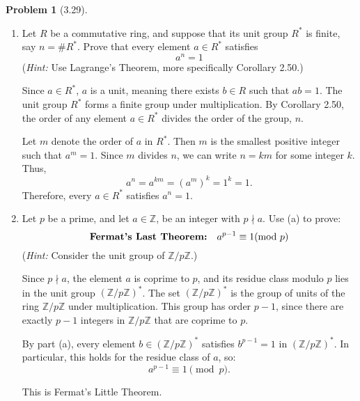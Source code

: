 \documentclass[12pt]{article}
\theoremstyle{definition}
\newtheorem{problem}{Problem}
\begin{document}
\begin{problem}[3.29]
    \begin{enumerate}[label=(\alph*)]
        \item Let $R$ be a commutative ring, and suppose that its unit group $R^*$ is finite, say $n = \#R^*$.
                Prove that every element $a \in R^*$ satisfies
                \[  
                    a^n = 1
                \]
        (\textit{Hint:} Use Lagrange's Theorem, more specifically Corollary 2.50.)

        \begin{solution}
            Since $a \in R^*$, $a$ is a unit, meaning there exists $b \in R$ such that $ab = 1$. The unit group $R^*$ forms a finite group under multiplication. By Corollary 2.50, the order of any element $a \in R^*$ divides the order of the group, $n$.
            
            Let $m$ denote the order of $a$ in $R^*$. Then $m$ is the smallest positive integer such that $a^m = 1$. Since $m$ divides $n$, we can write $n = km$ for some integer $k$. Thus,
            \[
            a^n = a^{km} = (a^m)^k = 1^k = 1.
            \]
            Therefore, every $a \in R^*$ satisfies $a^n = 1$.
        \end{solution}
        \item Let $p$ be a prime, and let $a \in \mathbb{Z}$, be an integer with $p \nmid a$. Use (a) to prove:
        \[ 
            \text{\textbf{Fermat's Last Theorem:}} \hspace{10px} a^{p - 1} \equiv 1 (\text{mod } p)
        \]
        (\textit{Hint:} Consider the unit group of $\mathbb{Z}/p\mathbb{Z}$.)

        \begin{solution}
            Since $p \nmid a$, the element $a$ is coprime to $p$, and its residue class modulo $p$ lies in the unit group $(\mathbb{Z}/p\mathbb{Z})^*$. The set $(\mathbb{Z}/p\mathbb{Z})^*$ is the group of units of the ring $\mathbb{Z}/p\mathbb{Z}$ under multiplication. This group has order $p-1$, since there are exactly $p-1$ integers in $\mathbb{Z}/p\mathbb{Z}$ that are coprime to $p$.
            
            By part (a), every element $b \in (\mathbb{Z}/p\mathbb{Z})^*$ satisfies $b^{p-1} = 1$ in $(\mathbb{Z}/p\mathbb{Z})^*$. In particular, this holds for the residue class of $a$, so:
            \[
            a^{p-1} \equiv 1 \pmod{p}.
            \]
            
            This is Fermat's Little Theorem.            
        \end{solution}
    \end{enumerate}
\end{problem}
\end{document}
